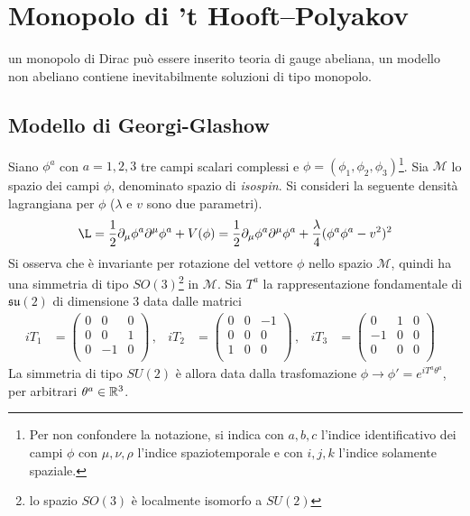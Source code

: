 \section{Monopolo di ’t Hooft–Polyakov}
un monopolo di Dirac può essere inserito teoria di gauge abeliana, un modello
non abeliano contiene inevitabilmente soluzioni di tipo monopolo.
\subsection{Modello di Georgi-Glashow}
Siano $\phi^a$ con $a=1,2,3$ tre campi scalari complessi e $\phi =
(\phi _1, \phi _2,\phi _3)$\footnote{
   Per non confondere la notazione, si indica con $a,b,c$ l'indice identificativo
   dei campi $\phi$ con $\mu,\nu,\rho$ l'indice spaziotemporale e con $i,j,k$
   l'indice solamente spaziale.
}.
Sia $\mathcal{M}$ lo spazio dei campi $\phi$, denominato spazio di \emph{isospin}.
Si consideri la seguente densità lagrangiana per $\phi$ ($\lambda$ e $v$ sono due
parametri).
$$
   \L = \frac{1}{2} \partial _\mu \phi ^a \partial ^\mu \phi^a
                + V(\phi)
               = \frac{1}{2} \partial _\mu \phi ^a \partial ^\mu \phi^a
                + \frac{\lambda}{4}( \phi^a \phi^a - v^2 )^2
$$
Si osserva che è invariante per rotazione del vettore $\phi$ nello spazio $\mathcal{M}$,
quindi ha una simmetria di tipo $SO(3)$\footnote{
  lo spazio $SO(3)$ è localmente isomorfo a $SU(2)$
} in $\mathcal{M}$.
Sia ${T^a}$ la rappresentazione fondamentale di $\mathfrak{su(2)}$ di dimensione 3
data dalle matrici
\begin{equation}
   \begin{aligned}
      i T_1 & = \begin{pmatrix}
                   0  & 0  & 0 \\
                   0  & 0  & 1 \\
                   0  & -1 & 0 \\
                 \end{pmatrix} \, , &
      i T_2 & = \begin{pmatrix}
                   0  & 0  & -1 \\
                   0  & 0  & 0 \\
                   1  & 0  & 0 \\
                 \end{pmatrix} \, , &
      i T_3 & = \begin{pmatrix}
                   0  & 1  & 0 \\
                   -1 & 0  & 0 \\
                   0  & 0  & 0 \\
                \end{pmatrix} &
   \end{aligned}
\end{equation}
La simmetria di tipo $SU(2)$ è allora data dalla trasfomazione
$\phi \to \phi' = e^{iT^a\theta^a}$, per arbitrari $\theta^a \in \mathbb{R} ^3 $.\\

